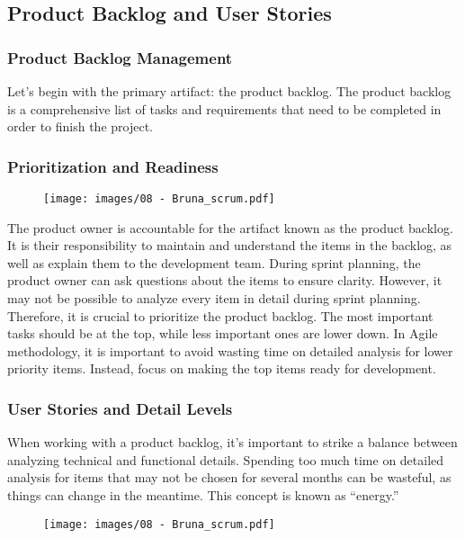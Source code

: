 \subsection{Product Backlog and User Stories}

\subsubsection{Product Backlog Management}

Let's begin with the primary artifact: the product backlog. The product
backlog is a comprehensive list of tasks and requirements that need to
be completed in order to finish the project.

\subsubsection{Prioritization and Readiness}

\begin{figure}[!h]
  \centering
  \texttt{[image: images/08 - Bruna\_scrum.pdf]}
\end{figure}

The product owner is accountable for the artifact known as the product
backlog. It is their responsibility to maintain and understand the items
in the backlog, as well as explain them to the development team. During
sprint planning, the product owner can ask questions about the items to
ensure clarity. However, it may not be possible to analyze every item in
detail during sprint planning. Therefore, it is crucial to prioritize
the product backlog. The most important tasks should be at the top,
while less important ones are lower down. In Agile methodology, it is
important to avoid wasting time on detailed analysis for lower priority
items. Instead, focus on making the top items ready for development.

\subsubsection{User Stories and Detail Levels}

When working with a product backlog, it's important to strike a balance
between analyzing technical and functional details. Spending too much
time on detailed analysis for items that may not be chosen for several
months can be wasteful, as things can change in the meantime. This
concept is known as ``energy.''

\begin{figure}[!h]
  \centering
  \texttt{[image: images/08 - Bruna\_scrum.pdf]}
\end{figure}

